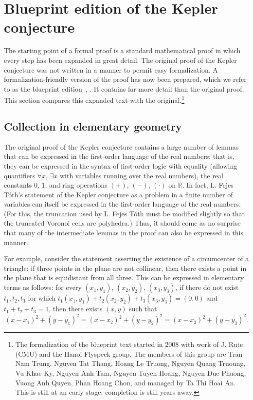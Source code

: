 \documentclass[11pt]{amsart}
\newcommand{\ring}[1]{\mathbb{#1}}
\begin{document}
\section{Blueprint edition of the Kepler conjecture}
\label{sec:blueprint}

The starting point of a formal proof is a standard mathematical proof in which every step
has been expanded in great detail.  The original proof of the Kepler conjecture was not written
in a manner to permit easy formalization.  A formalization-friendly version of the proof has
now been prepared, which we refer to as the blueprint edition~\cite{hales:2008:blueprint}, \cite{hales:2008:collection}.  It contains far more detail than the original proof.  This section 
compares this expanded text with the original.\footnote{The formalization of the blueprint text started in
2008 with work of J. Rute (CMU) and the Hanoi Flyspeck group. The members of this group are Tran Nam Trung, Nguyen Tat Thang, Hoang Le Truong, Nguyen Quang Truoung, Vu Khac Ky, Nguyen Anh Tam, Nguyen Tuyen Hoang, Nguyen Duc Phuong, Vuong Anh Quyen, Phan Hoang Chon, and managed by Ta Thi Hoai An.  This is still at an early stage; completion is still years away.}

\subsection*{Collection in elementary geometry}

The original proof of the Kepler conjecture contains a large number of lemmas that can be
expressed in the first-order language of the real numbers; that is, they can be expressed in
the syntax of first-order logic with equality (allowing quantifiers $\forall x$, $\exists x$ with variables
running over the real numbers), the real constants $0$, $1$, and ring operations $(+)$, $(-)$,
$(\cdot)$ on $\ring{R}$.  In fact, L. Fejes T\'oth's statement of the Kepler conjecture as
a problem in a finite number of variables can itself be expressed in the
first-order language of the real numbers.  (For this, the truncation used by L. Fejes T\'oth must be modified slightly so that the truncated Voronoi cells are polyhedra.)  Thus, it should come as no surprise that many
of the intermediate lemmas in the proof can also be expressed in this manner.

For example, consider the statement asserting the existence of a circumcenter of a triangle: 
if three points in the plane are not collinear, then there exists a
point in the plane that is equidistant from all three.  This can be expressed in elementary terms
as follows:  for every $(x_1,y_1)$, $(x_2,y_2)$, $(x_3,y_3)$, if there do not exist $t_1,t_2,t_3$
for which $t_1 (x_1,y_1) + t_2 (x_2,y_2)+ t_3 (x_3,y_3) = (0,0)$ and $t_1+t_2+t_3=1$, then there exists
$(x,y)$ such that 
$$
  (x-x_1)^2 + (y-y_1)^2 = (x-x_2)^2 + (y-y_2)^2 = (x-x_3)^2 + (y-y_3)^2. 
$$
\end{document}
